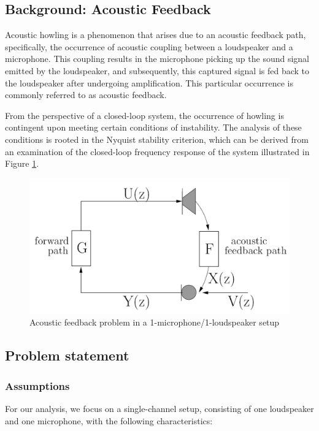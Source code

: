 \subsection{Background: Acoustic Feedback}

Acoustic howling is a phenomenon that arises due to an acoustic feedback path, specifically, the occurrence of acoustic coupling between a loudspeaker and a microphone. This coupling results in the microphone picking up the sound signal emitted by the loudspeaker, and subsequently, this captured signal is fed back to the loudspeaker after undergoing amplification. This particular occurrence is commonly referred to as acoustic feedback.

From the perspective of a closed-loop system, the occurrence of howling is contingent upon meeting certain conditions of instability. The analysis of these conditions is rooted in the Nyquist stability criterion, which can be derived from an examination of the closed-loop frequency response of the system illustrated in Figure \ref{fig:system_diagram_original}.

\begin{figure}[ht]
    \centering
    \includegraphics[width=0.8\columnwidth]{images/system_digram_original.png}
    \caption{Acoustic feedback problem in a 1-microphone/1-loudspeaker setup\cite{7077829}}
    \label{fig:system_diagram_original}
\end{figure}

\subsection{Problem statement}
\subsubsection{Assumptions}

For our analysis, we focus on a single-channel setup, consisting of one loudspeaker and one microphone, with the following characteristics:

